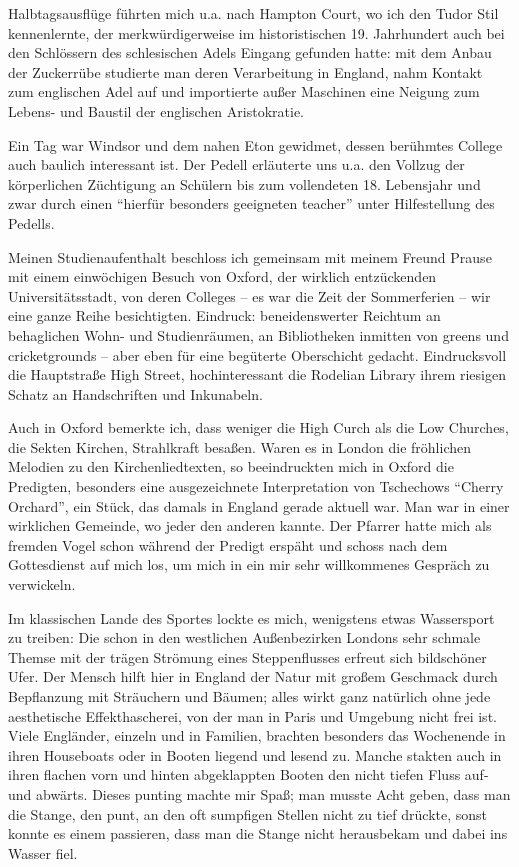 Halbtagsausflüge führten mich u.a. nach Hampton Court, wo ich den Tudor Stil kennenlernte, der merkwürdigerweise im historistischen 19. Jahrhundert auch bei den Schlössern des schlesischen Adels Eingang gefunden hatte: mit dem Anbau der Zuckerrübe studierte man deren Verarbeitung in England, nahm Kontakt zum englischen Adel auf und importierte außer Maschinen eine Neigung zum Lebens- und Baustil der englischen Aristokratie.

Ein Tag war Windsor und dem nahen Eton gewidmet, dessen berühmtes College auch baulich interessant ist. Der Pedell erläuterte uns u.a. den Vollzug der körperlichen Züchtigung an Schülern bis zum vollendeten 18. Lebensjahr und zwar durch einen \enquote{hierfür besonders geeigneten teacher} unter Hilfestellung des Pedells.

Meinen Studienaufenthalt beschloss ich gemeinsam mit meinem Freund Prause mit einem einwöchigen Besuch von Oxford, der wirklich entzückenden Universitätsstadt, von deren Colleges -- es war die Zeit der Sommerferien -- wir eine ganze Reihe besichtigten. Eindruck: beneidenswerter Reichtum an behaglichen Wohn- und Studienräumen, an Bibliotheken inmitten von greens und cricketgrounds -- aber eben für eine begüterte Oberschicht gedacht. Eindrucksvoll die Hauptstraße High Street, hochinteressant die Rodelian Library ihrem riesigen Schatz an Handschriften und Inkunabeln.

Auch in Oxford bemerkte ich, dass weniger die High Curch als die Low Churches, die Sekten Kirchen, Strahlkraft besaßen. Waren es in London die fröhlichen Melodien zu den Kirchenliedtexten, so beeindruckten mich in Oxford die Predigten, besonders eine ausgezeichnete Interpretation von Tschechows \enquote{Cherry Orchard}, ein Stück, das damals in England gerade aktuell war. Man war in einer wirklichen Gemeinde, wo jeder den anderen kannte. Der Pfarrer hatte mich als fremden Vogel schon während der Predigt erspäht und schoss nach dem Gottesdienst auf mich los, um mich in ein mir sehr willkommenes Gespräch zu verwickeln.

Im klassischen Lande des Sportes lockte es mich, wenigstens etwas Wassersport zu treiben: Die schon in den westlichen Außenbezirken Londons sehr schmale Themse mit der trägen Strömung eines Steppenflusses erfreut sich bildschöner Ufer. Der Mensch hilft hier in England der Natur mit großem Geschmack durch Bepflanzung mit Sträuchern und Bäumen; alles wirkt ganz natürlich ohne jede aesthetische Effekthascherei, von der man in Paris und Umgebung nicht frei ist. Viele Engländer, einzeln und in Familien, brachten besonders das Wochenende in ihren Houseboats oder in Booten liegend und lesend zu. Manche stakten auch in ihren flachen vorn und hinten abgeklappten Booten den nicht tiefen Fluss auf- und abwärts. Dieses punting machte mir Spaß; man musste Acht geben, dass man die Stange, den punt, an den oft sumpfigen Stellen nicht zu tief drückte, sonst konnte es einem passieren, dass man die Stange nicht herausbekam und dabei ins Wasser fiel.

